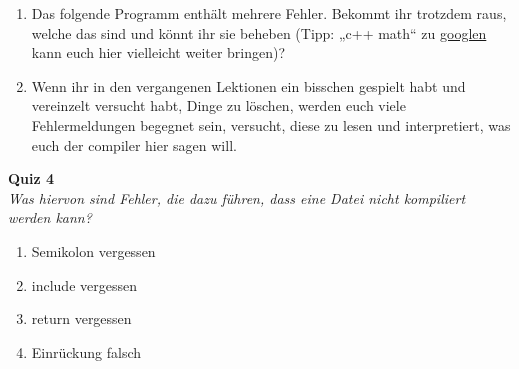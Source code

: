 
\begin{spiel}
\begin{enumerate}
    \item Das folgende Programm enthält mehrere Fehler. Bekommt ihr trotzdem
        raus, welche das sind und könnt ihr sie beheben (Tipp: „c++ math“ zu
        \href{https://lmgtfy.com/?q=c\%2B\%2B+math}{googlen} kann euch hier vielleicht weiter bringen)?
    \item Wenn ihr in den vergangenen Lektionen ein bisschen gespielt habt und
        vereinzelt versucht habt, Dinge zu löschen, werden euch viele
        Fehlermeldungen begegnet sein, versucht, diese zu lesen und
        interpretiert, was euch der compiler hier sagen will.
\end{enumerate}
\end{spiel}


\textbf{Quiz 4}\\
\textit{Was hiervon sind Fehler, die dazu führen, dass eine Datei nicht kompiliert werden kann?}
\begin{enumerate}[label=\alph*)]
    \item Semikolon vergessen
    \item include vergessen
    \item return vergessen
    \item Einrückung falsch
\end{enumerate}
